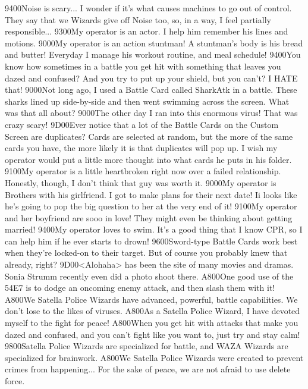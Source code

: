 {94}{00}Noise is scary... I wonder if it's what causes machines to go out of 
control. They say that we Wizards give off Noise too, 
so, in a way, I feel partially responsible... 
{93}{00}My operator is an actor. I help him remember his lines and motions. 
{90}{00}My operator is an action stuntman! 
A stuntman's body is his bread and butter! 
Everyday I manage his workout routine, and meal schedule! 
{94}{00}You know how sometimes in a battle you get hit with something that leaves you 
dazed and confused? And you try to put up your shield, but you can't? 
I HATE that! 
{90}{00}Not long ago, I used a Battle Card called SharkAtk in a battle. These sharks 
lined up side-by-side and then went swimming across the screen. 
What was that all about? 
{90}{00}The other day I ran into this enormous virus! 
That was crazy scary! 
{9D}{00}Ever notice that a lot of the Battle Cards on the Custom Screen are 
duplicates? Cards are selected at random, but the more of the same cards 
you have, the more likely it is that duplicates will pop up. 
I wish my operator would put a little more thought into 
what cards he puts in his folder. 
{91}{00}My operator is a little heartbroken right now over a failed relationship. 
Honestly, though, I don't think that guy was worth it. 
{90}{00}My operator is Brothers with his girlfriend. I got to make plans for their next date! 
Ii looks like he's going to pop the big question to her at the very end of it! 
{91}{00}My operator and her boyfriend are sooo in love! 
They might even be thinking about getting married! 
{94}{00}My operator loves to swim. 
It's a good thing that I know CPR, so I can help 
him if he ever starts to drown! 
{96}{00}Sword-type Battle Cards work best when they're locked-on to their target. 
But of course you probably knew that already, right? 
{9D}{00}<Alohaha> has been the site of many movies and dramas. 
Sonia Strumm recently even did a photo shoot there. 
{A8}{00}One good use of the {54}{E7} is to dodge 
an oncoming enemy attack, and then slash them with it! 
{A8}{00}We Satella Police Wizards have advanced, powerful, battle capabilities. 
We don't lose to the likes of viruses. 
{A8}{00}As a Satella Police Wizard, I have devoted myself to the fight for peace! 
{A8}{00}When you get hit with attacks that make you dazed and confused, and you 
can't fight like you want to, just try and stay calm! 
{98}{00}Satella Police Wizards are specialized for battle, and 
WAZA Wizards are specialized for brainwork. 
{A8}{00}We Satella Police Wizards were created to prevent crimes from happening... 
For the sake of peace, we are not afraid to use delete force. 
